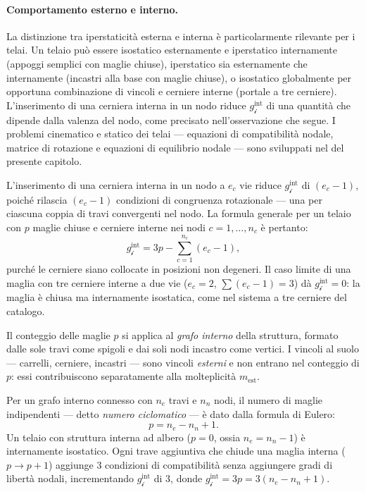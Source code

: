 \paragraph{Comportamento esterno e interno.}
La distinzione tra iperstaticità esterna e interna
è particolarmente rilevante per i telai. Un telaio
può essere isostatico esternamente e iperstatico
internamente (appoggi semplici con maglie chiuse),
iperstatico sia esternamente che internamente
(incastri alla base con maglie chiuse), o isostatico
globalmente per opportuna combinazione di vincoli
e cerniere interne (portale a tre cerniere).
L'inserimento di una cerniera interna in un nodo
riduce $g_{\mathscr{i}}^{\text{int}}$ di una quantità
che dipende dalla valenza del nodo, come precisato
nell'osservazione che segue.
I problemi cinematico e statico dei telai ---
equazioni di compatibilità nodale, matrice di
rotazione e equazioni di equilibrio nodale ---
sono sviluppati nel 
del presente capitolo.

\begin{oss}
	L'inserimento di una cerniera interna in un
	nodo a $e_c$ vie riduce $g_{\mathscr{i}}^{\text{int}}$
	di $(e_c - 1)$, poiché rilascia $(e_c - 1)$
	condizioni di congruenza rotazionale --- una
	per ciascuna coppia di travi convergenti nel
	nodo. La formula generale per un telaio con
	$p$ maglie chiuse e cerniere interne nei nodi
	$c = 1, \ldots, n_c$ è pertanto:
	\begin{equation}\label{eq:gint_cerniere}
		g_{\mathscr{i}}^{\text{int}}
		= 3p - \sum_{c=1}^{n_c}(e_c - 1),
	\end{equation}
	purché le cerniere siano collocate in posizioni
	non degeneri. Il caso limite di una maglia con
	tre cerniere interne a due vie ($e_c = 2$,
	$\sum(e_c-1) = 3$) dà
	$g_{\mathscr{i}}^{\text{int}} = 0$: la maglia
	è chiusa ma internamente isostatica, come nel
	sistema a tre cerniere del catalogo.
\end{oss}


\begin{oss}
	Il conteggio delle maglie $p$ si applica al
	\emph{grafo interno} della struttura, formato
	dalle sole travi come spigoli e dai soli nodi
	incastro come vertici. I vincoli al suolo ---
	carrelli, cerniere, incastri --- sono vincoli
	\emph{esterni} e non entrano nel conteggio di
	$p$: essi contribuiscono separatamente alla
	molteplicità $m_\text{est}$.
	
	Per un grafo interno connesso con $n_e$ travi
	e $n_n$ nodi, il numero di maglie indipendenti
	--- detto \emph{numero ciclomatico} --- è dato
	dalla formula di Eulero:
	\begin{equation}\label{eq:eulero_grafo}
		p = n_e - n_n + 1.
	\end{equation}
	Un telaio con struttura interna ad albero
	($p = 0$, ossia $n_e = n_n - 1$) è internamente
	isostatico. Ogni trave aggiuntiva che chiude una
	maglia interna ($p \to p+1$) aggiunge $3$
	condizioni di compatibilità senza aggiungere
	gradi di libertà nodali, incrementando
	$g_{\mathscr{i}}^{\text{int}}$ di $3$, donde
	$g_{\mathscr{i}}^{\text{int}} = 3p = 3(n_e-n_n+1)$.
\end{oss}

